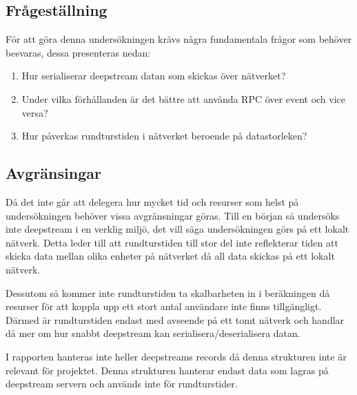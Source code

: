 \subsection{Frågeställning}
\label{subsec:tim-research-questions}
För att göra denna undersökningen krävs några fundamentala frågor som behöver besvaras, dessa presenteras nedan:
\begin{enumerate}

\item\label{tim-fs:1} Hur serialiserar deepstream datan som skickas över nätverket?

\item\label{tim-fs:2} Under vilka förhållanden är det bättre att använda RPC över event och vice versa?

\item\label{tim-fs:3} Hur påverkas rundturstiden i nätverket beroende på datastorleken?  

\end{enumerate}

\subsection{Avgränsingar}
\label{subsec:tim-delimitations}
Då det inte går att delegera hur mycket tid och resurser som helst på undersökningen behöver vissa avgränsningar göras. Till en början så undersöks inte deepstream i en verklig miljö, det vill säga undersökningen görs på ett lokalt nätverk. Detta leder till att rundturstiden till stor del inte reflekterar tiden att skicka data mellan olika enheter på nätverket då all data skickas på ett lokalt nätverk.

Dessutom så kommer inte rundturstiden ta skalbarheten in i beräkningen då resurser för att koppla upp ett stort antal användare inte finns tillgängligt. Därmed är rundturstiden endast med avseende på ett tomt nätverk och handlar då mer om hur snabbt deepstream kan serialisera/deserialisera datan.

I rapporten hanteras inte heller deepstreams records då denna strukturen inte är relevant för projektet. Denna strukturen hanterar endast data som lagras på deepstream servern och används inte för rundturstider.
